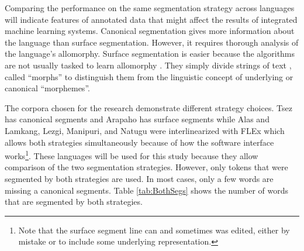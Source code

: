 Comparing the performance on the same segmentation strategy across languages will indicate features of annotated data that might affect the results of integrated machine learning systems. Canonical segmentation gives more information about the language than surface segmentation. However, it requires thorough analysis of the language's allomorphy. 
Surface segmentation is easier because the algorithms are not usually tasked to learn allomorphy \citep{goldsmith_computational_2017}. They simply divide strings of text \citep{virpioja_empirical_2011}, called ``morphs'' to distinguish them from the linguistic concept of underlying or canonical ``morphemes''. 


The corpora chosen for the research demonstrate different strategy choices. Tsez has canonical segments and Arapaho has surface segments while Alas and Lamkang, Lezgi, Manipuri, and Natugu were interlinearized with FLEx which allows both strategies simultaneously because of how the software interface works\footnote{Note that the surface segment line can and sometimes was edited, either by mistake or to include some underlying representation.}. These languages will be used for this study because they allow comparison of the two segmentation strategies. However, only tokens that were segmented by both strategies are used. In most cases, only a few words are missing a canonical segments. Table \ref{tab:BothSegs} shows the number of words that are segmented by both strategies. 

